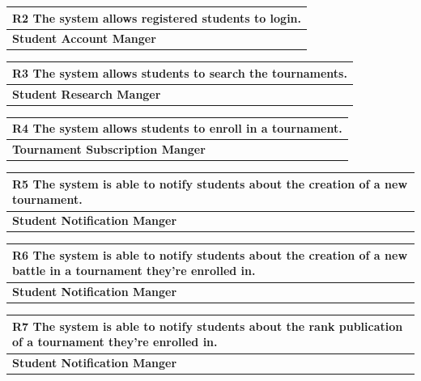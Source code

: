 \documentclass[12pt, a4paper]{report}
\begin{document}
\begin{table}[H]
    \begin{tabularx}{\textwidth}{X}
    \textbf{R2} The system allows registered students to login.\\
    \hline 
    \textbf{Student Account Manger}
\end{tabularx}
\end{table}

\begin{table}[H]
    \begin{tabularx}{\textwidth}{X}
    \textbf{R3} The system allows students to search the tournaments.\\
    \hline 
    \textbf{Student Research Manger}
    \end{tabularx}
\end{table}

\begin{table}[H]
    \begin{tabularx}{\textwidth}{X}
    \textbf{R4} The system allows students to enroll in a tournament.\\
    \hline 
    \textbf{Tournament Subscription Manger}
    \end{tabularx}
\end{table}

\begin{table}[H]
    \begin{tabularx}{\textwidth}{X}
    \textbf{R5} The system is able to notify students about the creation of a new tournament.\\
    \hline 
    \textbf{Student Notification Manger}
    \end{tabularx}
\end{table}

\begin{table}[H]
    \begin{tabularx}{\textwidth}{X}
    \textbf{R6} The system is able to notify students about the creation of a new battle in a tournament they're enrolled in.\\
    \hline 
    \textbf{Student Notification Manger}
    \end{tabularx}
\end{table}

\begin{table}[H]
    \begin{tabularx}{\textwidth}{X}
    \textbf{R7} The system is able to notify students about the rank publication of a tournament they're enrolled in.\\
    \hline 
    \textbf{Student Notification Manger}
    \end{tabularx}
\end{table}
\end{document}
